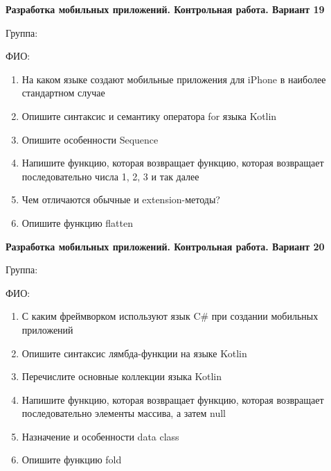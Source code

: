 \documentclass[12pt]{article}
\begin{document}
\newpage\begin{minipage}{\textwidth}
\textbf{Разработка мобильных приложений. Контрольная работа. Вариант 19}

Группа: \underline{\hspace{3cm}}

ФИО: \underline{\hspace{10cm}}

\begin{enumerate}
\item На каком языке создают мобильные приложения для iPhone в наиболее стандартном случае
\item Опишите синтаксис и семантику оператора for языка Kotlin
\item Опишите особенности Sequence
\item Напишите функцию, которая возвращает функцию, которая возвращает последовательно числа 1, 2, 3 и так далее
\item Чем отличаются обычные и extension-методы?
\item Опишите функцию flatten

\end{enumerate}
\end{minipage}

\newpage\begin{minipage}{\textwidth}
\textbf{Разработка мобильных приложений. Контрольная работа. Вариант 20}

Группа: \underline{\hspace{3cm}}

ФИО: \underline{\hspace{10cm}}

\begin{enumerate}
\item С каким фреймворком используют язык C\# при создании мобильных приложений
\item Опишите синтаксис лямбда-функции на языке Kotlin
\item Перечислите основные коллекции языка Kotlin
\item Напишите функцию, которая возвращает функцию, которая возвращает последовательно элементы массива, а затем null
\item Назначение и особенности data class
\item Опишите функцию fold

\end{enumerate}
\end{minipage}
\end{document}

